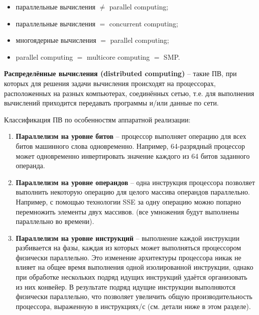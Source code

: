 \begin{itemize}
    \item параллельные вычисления $\neq$ parallel computing;			
    \item параллельные вычисления $=$ concurrent computing;
    \item многоядерные вычисления $=$ parallel computing;
    \item parallel computing $=$ multicore computing $=$ SMP.
\end{itemize}

\textbf{Распределённые вычисления (distributed computing)} -- такие ПВ, при которых для решения задачи вычисления происходят на процессорах, расположенных на разных компьютерах, соединённых сетью, т.е. для выполнения вычислений приходится передавать программы и/или данные по сети.

Классификация ПВ по особенностям аппаратной реализации:

\begin{enumerate}
    \sloppy
    \item\textbf{Параллелизм на уровне битов} -- процессор выполняет операцию для всех битов машинного слова одновременно. Например, 64-разрядный процессор может одновременно инвертировать значение каждого из 64 битов заданного операнда.
    \item\textbf{Параллелизм на уровне операндов} -- одна инструкция процессора позволяет выполнить некоторую операцию для целого массива операндов параллельно. Например, с помощью технологии SSE за одну операцию можно попарно перемножить элементы двух массивов. (все умножения будут выполнены параллельно во времени). 
    \item\textbf{Параллелизм на уровне инструкций} -- выполнение каждой инструкции разбивается на фазы, каждая из которых может выполняться процессором физически параллельно. Это изменение архитектуры процессора никак не влияет на общее время выполнения одной изолированной инструкции, однако при обработке нескольких подряд идущих инструкций удаётся организовать из них конвейер. В результате подряд идущие инструкции выполняются физически параллельно, что позволяет увеличить общую производительность процессора, выраженную в инструкциях/с (см. детали ниже в этом разделе).
\end{enumerate}


